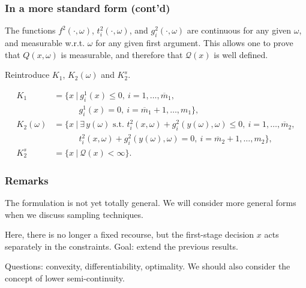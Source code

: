 \documentclass[aspectratio=169]{beamer}
\begin{document}
\begin{frame}
\frametitle{In a more standard form (cont'd)}

The functions $f^2(\cdot, \omega)$, $t_i^2(\cdot, \omega)$, and $g_i^2(\cdot, \omega)$ are continuous for any given $\omega$, and measurable w.r.t. $\omega$ for any given first argument.
This allows one to prove that $Q(x,\omega)$ is measurable, and therefore that $\mathcal{Q}(x)$ is well defined.

\mbox{}

Reintroduce $K_1$, $K_2(\omega)$ and $K_2^s$.

\begin{align*}
K_1 & = \lbrace x \ |\ g_i^1(x) \leq 0,\ i =
1,\ldots,\overline{m}_1, \\
& \quad \qquad g_i^1(x) = 0,\ i = \overline{m}_1+1,\ldots,m_1 \rbrace, \\
K_2(\omega) & = \lbrace x \ |\ \exists\, y(\omega) \mbox{ s.t. }
 t_i^2(x, \omega) + g_i^2(y(\omega), \omega) \leq 0,\ i
= 1,\ldots,\overline{m}_2,\\
& \quad \qquad t_i^2(x, \omega) + g_i^2(y(\omega), \omega) = 0, \ i =
\overline{m}_2+1,\ldots,m_2 \rbrace, \\
K_2^s & = \lbrace x \ |\ \mathcal{Q}(x) < \infty \rbrace.
\end{align*}

\end{frame}

\begin{frame}
\frametitle{Remarks}

The formulation is not yet totally general.
We will consider more general forms when we discuss sampling techniques.

\mbox{}

Here, there is no longer a fixed recourse, but the first-stage decision $x$ acts separately in the constraints.
Goal: extend the previous results.

\mbox{}

Questions: convexity, differentiability, optimality.
We should also consider the concept of lower semi-continuity.

\end{frame}
\end{document}
